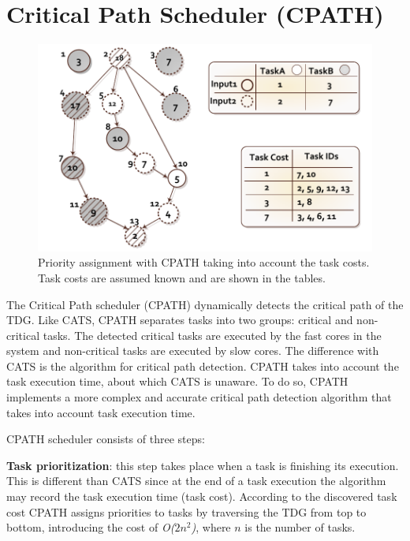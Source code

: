 \section{Critical Path Scheduler (CPATH)}
\label{sec.scheduling.cpath}
\begin{figure}[tr]
\includegraphics[width=\columnwidth]{figures/cpath_priorities.pdf} 
\centering
\caption{Priority assignment with CPATH taking into account the task costs. Task costs are assumed known and are shown in the tables.}
\label{cpath}
\vspace{-0.5cm}
\end{figure}


The Critical Path scheduler (CPATH) dynamically detects the critical path of the TDG.
Like CATS, CPATH separates tasks into two groups: critical and non-critical tasks.
The detected critical tasks are executed by the fast cores in the system and non-critical tasks are executed by slow cores.
The difference with CATS is the algorithm for critical path detection.
CPATH takes into account the task execution time, about which CATS is unaware.
To do so, CPATH implements a more complex and accurate critical path detection algorithm that takes into account task execution time.

CPATH scheduler consists of three steps:

\textbf{Task prioritization}: this step takes place when a task is finishing its execution. This is different than CATS since at the end of a task execution the algorithm may record the task execution time (task cost).
According to the discovered task cost CPATH assigns priorities to tasks by traversing the TDG from top to bottom, introducing the cost of \textit{O($2n^2$)}, where \textit{$n$} is the number of tasks.

